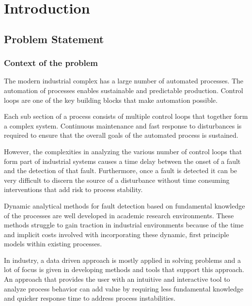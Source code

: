 
\chapter{Introduction}

\section{Problem Statement}

\subsection{Context of the problem}

The modern industrial complex has a large number of automated processes. The automation of processes enables sustainable and predictable production. Control loops are one of the key building blocks that make automation possible.\par
Each sub section of a process consists of multiple control loops that together form a complex system. Continuous maintenance and fast response to disturbances is required to ensure that the overall goals of the automated process is sustained.\par
However, the complexities in analyzing the various number of control loops that form part of industrial systems causes a time delay between the onset of a fault and the detection of that fault. Furthermore, once a fault is detected it can be very difficult to discern the source of a disturbance without time consuming interventions that add risk to process stability.\par
Dynamic analytical methods for fault detection based on fundamental knowledge of the processes are well developed in academic research environments. These methods struggle to gain traction in industrial environments because of the time and implicit costs involved with incorporating these dynamic, first principle models within existing processes.\par
In industry, a data driven approach is mostly applied in solving problems and a lot of focus is given in developing methods and tools that support this approach. An approach that provides the user with an intuitive and interactive tool to analyze process behavior can add value by requiring less fundamental knowledge and quicker response time to address process instabilities.\par
